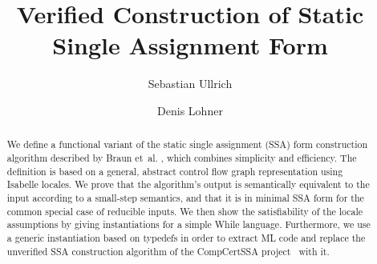 \documentclass[11pt,a4paper]{article}
\begin{document}
\title{Verified Construction of Static Single Assignment Form}
\author{Sebastian Ullrich\and Denis Lohner}
\maketitle

\newcommand\pf{$\phi$~function}

\begin{abstract}
  We define a functional variant of the static single assignment (SSA) form construction algorithm described by Braun et~al. \cite{braun13cc}, which combines simplicity and efficiency. The definition is based on a general, abstract control flow graph representation using Isabelle locales. We prove that the algorithm's output is semantically equivalent to the input according to a small-step semantics, and that it is in minimal SSA form for the common special case of reducible inputs. We then show the satisfiability of the locale assumptions by giving instantiations for a simple While language. Furthermore, we use a generic instantiation based on typedefs in order to extract ML code and replace the unverified SSA construction algorithm of the CompCertSSA project~\cite{barthe14} with it.
\end{abstract}

\tableofcontents





\end{document}
